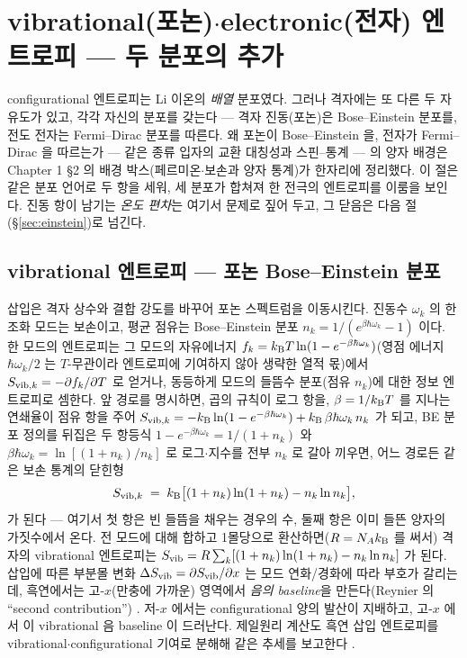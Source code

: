 \section{vibrational(포논)$\cdot$electronic(전자) 엔트로피 --- 두 분포의 추가}\label{sec:vibel}

configurational 엔트로피는 Li 이온의 \emph{배열} 분포였다. 그러나 격자에는 또 다른 두 자유도가 있고, 각각
자신의 분포를 갖는다 --- 격자 진동(포논)은 Bose--Einstein 분포를, 전도 전자는 Fermi--Dirac 분포를 따른다.
왜 포논이 Bose--Einstein 을, 전자가 Fermi--Dirac 을 따르는가 --- 같은 종류 입자의 교환 대칭성과
스핀--통계 --- 의 양자 배경은 Chapter 1 §2 의 배경 박스(페르미온$\cdot$보손과 양자 통계)가 한자리에 정리했다.
이 절은 같은 분포 언어로 두 항을 세워, 세 분포가 합쳐져 한 전극의 엔트로피를 이룸을 보인다. 진동 항이
남기는 \emph{온도 편차}는 여기서 문제로 짚어 두고, 그 닫음은 다음 절(\S\ref{sec:einstein})로 넘긴다.

\subsection{vibrational 엔트로피 --- 포논 Bose--Einstein 분포}\label{ssec:vib}
삽입은 격자 상수와 결합 강도를 바꾸어 포논 스펙트럼을 이동시킨다. 진동수 $\omega_k$ 의 한 조화 모드는
보손이고, 평균 점유는 Bose--Einstein 분포 $n_k=1/(e^{\beta\hbar\omega_k}-1)$ 이다. 한 모드의 엔트로피는 그
모드의 자유에너지 $f_k=k_{\mathrm B} T\ln(1-e^{-\beta\hbar\omega_k})$(영점 에너지 $\hbar\omega_k/2$ 는 $T$-무관이라
엔트로피에 기여하지 않아 생략한 열적 몫)에서 $S_{\mathrm{vib},k}=-\partial f_k/\partial T$ 로 얻거나,
동등하게 모드의 들뜸수 분포(점유 $n_k$)에 대한 정보 엔트로피로 셈한다. 앞 경로를 명시하면, 곱의 규칙이
로그 항을, $\beta=1/k_{\mathrm B} T$ 를 지나는 연쇄율이 점유 항을 주어
$S_{\mathrm{vib},k}=-k_{\mathrm B}\ln(1-e^{-\beta\hbar\omega_k})+k_{\mathrm B}\,\beta\hbar\omega_k\,n_k$ 가 되고, BE 분포 정의를 뒤집은 두
항등식 $1-e^{-\beta\hbar\omega_k}=1/(1+n_k)$ 와 $\beta\hbar\omega_k=\ln[(1+n_k)/n_k]$ 로 로그$\cdot$지수를 전부
$n_k$ 로 갈아 끼우면, 어느 경로든 같은 보손 통계의 닫힌형
\begin{equation}
S_{\mathrm{vib},k} \;=\; k_{\mathrm B}\bigl[(1+n_k)\ln(1+n_k) - n_k\ln n_k\bigr],
\label{eq:Svib_mode}
\end{equation}
가 된다 --- 여기서 첫 항은 빈 들뜸을 채우는 경우의 수, 둘째 항은 이미 들뜬 양자의 가짓수에서 온다. 전
모드에 대해 합하고 1몰당으로 환산하면($R=N_Ak_{\mathrm B}$ 를 써서) 격자의 vibrational 엔트로피는
$S_{\mathrm{vib}}=R\sum_k[(1+n_k)\ln(1+n_k)-n_k\ln n_k]$ 가 된다. 삽입에 따른 부분몰 변화 $\Delta S_{\mathrm{vib}}=\partial
S_{\mathrm{vib}}/\partial x$ 는 모드 연화/경화에 따라 부호가 갈리는데, 흑연에서는 고-$x$(만충에 가까운) 영역에서
\emph{음의 baseline}을 만든다(Reynier 의 ``second contribution'') \cite{reynier2003}. 저-$x$ 에서는
configurational 양의 발산이 지배하고, 고-$x$ 에서 이 vibrational 음 baseline 이 드러난다. 제일원리 계산도
흑연 삽입 엔트로피를 vibrational$\cdot$configurational 기여로 분해해 같은 추세를 보고한다 \cite{jpcc2021}.


